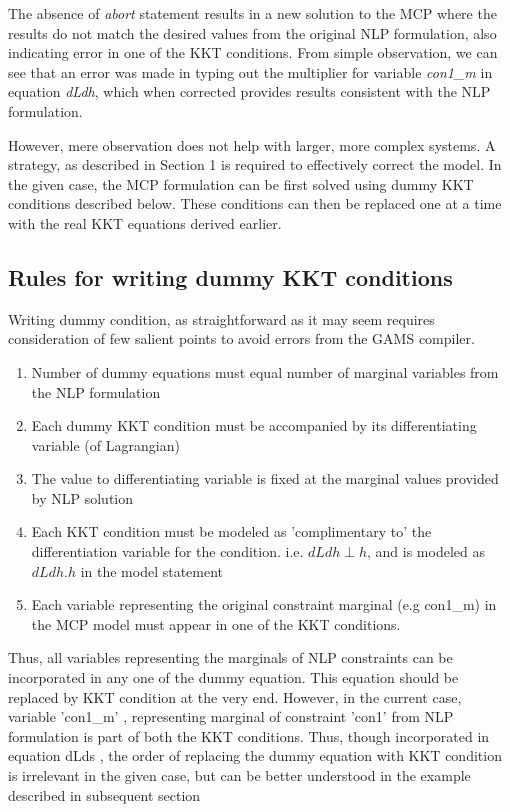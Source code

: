 \documentclass{article}
\begin{document}



\noindent The absence of \textit{abort} statement results in a new solution to the MCP where the results do not match the desired values from the original NLP formulation, also indicating error in one of the KKT conditions. From simple observation, we can see that an error was made in typing out the multiplier for variable \textit{con1\_m} in equation \textit{dLdh}, which when corrected provides results consistent with the NLP formulation. 

However, mere observation does not help with larger, more complex  systems. A strategy, as described in Section 1 is required to effectively correct the model. In the given case, the MCP formulation can be first solved using dummy KKT conditions described below. These conditions can then be replaced one at a time with the real KKT equations derived earlier. 



\subsection{Rules for writing dummy KKT conditions}

Writing dummy condition, as straightforward as it may seem requires consideration of few salient points to avoid errors from the GAMS compiler.

\begin{enumerate}
	\item Number of dummy equations must equal number of marginal variables from the NLP formulation
	\item Each dummy KKT condition must be accompanied by its differentiating variable (of Lagrangian) 
	\item The value to differentiating variable is fixed at the marginal values provided by NLP solution
	\item Each KKT condition must be modeled as 'complimentary to' the differentiation variable for the condition. i.e. $dLdh \perp h$, and is modeled as $dLdh.h$ in the model statement
	\item Each variable representing the original constraint marginal (e.g con1\_m) in the MCP model must appear in one of the KKT conditions. 
	
\end{enumerate}

Thus, all variables representing the marginals of NLP constraints can be incorporated in any one of the dummy equation. This equation should be replaced by KKT condition at the very end. However, in the current case, variable 'con1\_m' , representing marginal of constraint 'con1' from NLP formulation is part of both the KKT conditions. Thus, though incorporated in equation dLds , the order of replacing the dummy equation with KKT condition is irrelevant in the given case, but can be better understood in the example described in subsequent section
\end{document}

